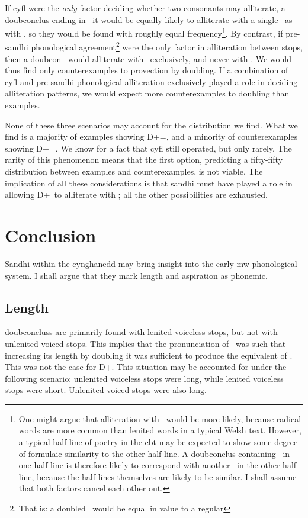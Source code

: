 If \gls{cyfl} were the \emph{only} factor deciding whether two consonants may alliterate, a \gls{doubconclus} ending in \lT\ it would be equally likely to alliterate with a single \lT\ as with \xT, so they would be found with  roughly equal frequency\footnote{One might argue that alliteration with \xT\ would be more likely, because radical words are more common than lenited words in a typical Welsh text. However, a typical half-line of poetry in the \gls{cbt} may be expected to show some degree of formulaic similarity to the other half-line. A \gls{doubconclus} containing \lT\ in one half-line is therefore likely to correspond with another \lT\ in the other half-line, because the half-lines themselves are likely to be similar. I shall assume that both factors cancel each other out.}.
By contrast, if pre-sandhi phonological agreement\footnote{That is: a doubled \lT\ would be equal in value to a regular \lT} were the only factor in alliteration between stops, then a \gls{doubcon} \lT\ would alliterate with \lT\ exclusively, and never with \xT. We would thus find only counterexamples to provection by doubling. If a combination of \gls{cyfl} and pre-sandhi phonological alliteration exclusively played a role in deciding alliteration patterns, we would expect more counterexamples to doubling than examples.

None of these three scenarios may account for the distribution we find. What we find is a majority of examples showing \gls{D}+\lT=\xT, and a minority of counterexamples showing \gls{D}+\lT=\lT. We know for a fact that \gls{cyfl} still operated, but only rarely. The rarity of this phenomenon means that the first option, predicting a fifty-fifty distribution between examples and counterexamples, is not viable. The implication of all these considerations is that sandhi must have played a role in allowing \gls{D}+\lT\ to alliterate with \xT; all the other possibilities are exhausted. 

\section{Conclusion}
\label{sec:conclusion}
Sandhi within the cynghanedd may bring insight into the early \gls{mw} phonological system. I shall argue that they mark length and aspiration as phonemic. 

\subsection{Length}
\label{sec:length}
\Gls{doubconclus}s are primarily found with lenited voiceless stops, but not with unlenited voiced stops. This implies that the pronunciation of \lT\ was such that increasing its length by doubling it was sufficient to produce the equivalent of \xT. This was not the case for \gls{D}+\xD. This situation may be accounted for under the following scenario: unlenited voiceless stops were long, while lenited voiceless stops were short. Unlenited voiced stops were also long. 

